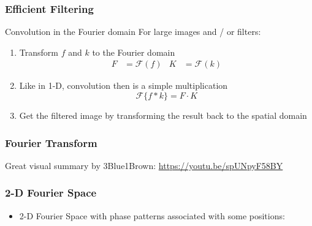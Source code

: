 \begin{frame}
    \frametitle{Efficient Filtering}
    \begin{block}{Convolution in the Fourier domain}
        For large images and /  or filters:
        \begin{enumerate}
            \item Transform $f$ and $k$ to the Fourier domain
                  \begin{align*}
                      F & =	\mathcal{F}(f) & K & = \mathcal{F}(k)
                  \end{align*}
            \item Like in 1-D, convolution then is a simple multiplication
                  \begin{equation*}
                      \mathcal{F}\lbrace f\ast k\rbrace = F\cdot K
                  \end{equation*}
            \item Get the filtered image by transforming the result back to the
                  spatial domain
        \end{enumerate}
    \end{block}

\end{frame}

\begin{frame}
    \frametitle{Fourier Transform}
    \begin{center}
    Great visual summary by 3Blue1Brown:
        \url{https://youtu.be/spUNpyF58BY}
    \end{center}
\end{frame}

\begin{frame}
	\frametitle{2-D Fourier Space}
	
	\begin{itemize}
		\item 2-D Fourier Space with phase patterns associated with some positions:
	\end{itemize}
	
	\vspace{-2ex}
	
	\begin{center}
		
	\end{center}
\end{frame}


